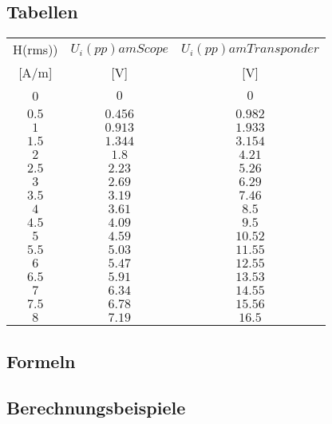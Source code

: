 \documentclass[12pt,a4paper,ngerman]{article}
\begin{document}
\subsection{Tabellen}
\begin{tabular}{ |c|c|c| }
  \hline

    H(rms)) & $U_i(pp) am Scope$ & $U_i(pp) am Transponder$\\

	[A/m] & [V] & [V] \\
  \hline
  0 & $0$ & $0$\\
  \hline
  $0.5$ & $0.456$ & $0.982$ \\
  \hline
  $1$ & $0.913$ & $1.933$\\
  \hline
  $1.5$ & $1.344$ & $3.154$\\
    \hline
  $2$ & $1.8$ & $4.21$\\
    \hline
  $2.5$ & $2.23$ & $5.26$ \\
    \hline
  $3$ & $2.69$ & $6.29$\\
     \hline
  $3.5$ & $3.19$ & $7.46$ \\ 
    \hline
  $4$ & $3.61$ & $8.5$  \\
    \hline
  $4.5$ & $4.09$ & $9.5$  \\
    \hline
  $5$ & $4.59$ & $10.52$  \\
    \hline
  $5.5$ & $5.03$ & $11.55$  \\
    \hline
  $6$ & $5.47$ & $12.55$ \\
     \hline
  $6.5$ & $5.91$ & $13.53$ \\
      \hline
  $7$ & $6.34$ & $14.55$ \\ 
      \hline
  $7.5$ & $6.78$ & $15.56$  \\
      \hline
  $8$ & $7.19$ & $16.5$  \\
      \hline
  \hline
 
\end{tabular} 
\subsection{Formeln}

\subsection{Berechnungsbeispiele}


\pagebreak
\end{document}
